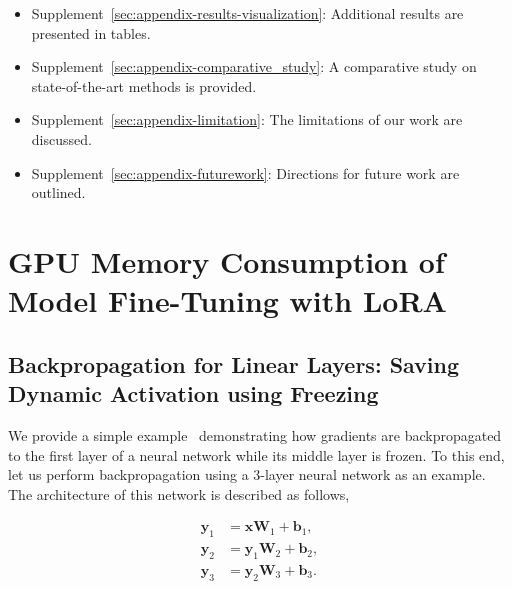 \documentclass[sigconf]{acmart}
\begin{document}
\begin{itemize}
    \item Supplement~\ref{sec:appendix-results-visualization}: Additional results are presented in tables.
    
    \item Supplement~\ref{sec:appendix-comparative_study}: A comparative study on state-of-the-art methods is provided.

    \item Supplement~\ref{sec:appendix-limitation}: The limitations of our work are discussed.
   
    \item Supplement~\ref{sec:appendix-futurework}: Directions for future work are outlined.

\end{itemize}





\section{GPU Memory Consumption of Model Fine-Tuning with LoRA}\label{sec:appendix-gpu-memory-consumption}

    \subsection{Backpropagation for Linear Layers: Saving Dynamic Activation using Freezing}\label{subsec:appendix-dynamic-activation}
    
    We provide a simple example~\cite{ardakani2024slimfit} demonstrating how gradients are backpropagated to the first layer of a neural network while its middle layer is frozen. To this end, let us perform backpropagation using a 3-layer neural network as an example. The architecture of this network is described as follows,
    
    \begin{align}
        \mathbf{y}_1 &= \mathbf{x}\mathbf{W}_1 + \mathbf{b}_1, \\
        \mathbf{y}_2 &= \mathbf{y}_1\mathbf{W}_2 + \mathbf{b}_2, \\
        \mathbf{y}_3 &= \mathbf{y}_2\mathbf{W}_3 + \mathbf{b}_3.
    \end{align}
    
\end{document}
